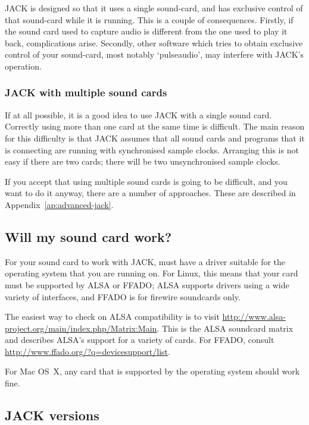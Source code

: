 \documentclass[10pt,a4paper]{book}
\begin{document}
JACK is designed so that it uses a single sound-card, and has
exclusive control of that sound-card while it is running.  This is a
couple of consequences.  Firstly, if the sound card used to capture
audio is different from the one used to play it back, complications
arise.  Secondly, other software which tries to obtain exclusive
control of your sound-card, most notably `pulseaudio', may interfere
with JACK's operation.

\subsubsection{JACK with multiple sound cards}
\label{sec:jack-multiple-cards}

If at all possible, it is a good idea to use JACK with a single sound
card.  Correctly using more than one card at the same time is
difficult.  The main reason for this difficulty is that JACK assumes
that all sound cards and programs that it is connecting are running
with synchronised sample clocks.  Arranging this is not easy if there
are two cards; there will be two unsynchronised sample clocks.

If you accept that using multiple sound cards is going to be
difficult, and you want to do it anyway, there are a number of
approaches.  These are described in Appendix~\ref{ap:advanced-jack}.

\subsection{Will my sound card work?}

For your sound card to work with JACK, must have a driver suitable for
the operating system that you are running on.  For Linux, this means
that your card must be supported by ALSA or FFADO; ALSA supports
drivers using a wide variety of interfaces, and FFADO is for firewire
soundcards only. 

The easiest way to check on ALSA compatibility is to visit
\url{http://www.alsa-project.org/main/index.php/Matrix:Main}.  This is
the ALSA soundcard matrix and describes ALSA's support for a variety
of cards.  For FFADO, consult
\url{http://www.ffado.org/?q=devicesupport/list}.

For Mac OS~X, any card that is supported by the operating system
should work fine.


\subsection{JACK versions}
\end{document}
